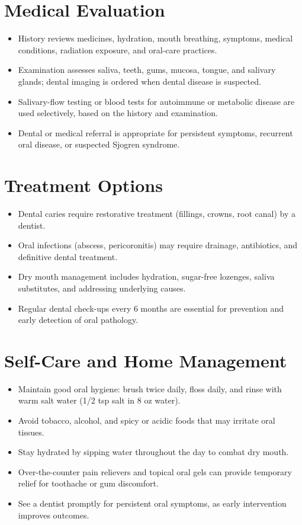 \section*{Medical Evaluation}
\begin{itemize}
  \item History reviews medicines, hydration, mouth breathing, symptoms, medical conditions, radiation exposure, and oral-care practices.
  \item Examination assesses saliva, teeth, gums, mucosa, tongue, and salivary glands; dental imaging is ordered when dental disease is suspected.
  \item Salivary-flow testing or blood tests for autoimmune or metabolic disease are used selectively, based on the history and examination.
  \item Dental or medical referral is appropriate for persistent symptoms, recurrent oral disease, or suspected Sjogren syndrome.
\end{itemize}

\section*{Treatment Options}
\begin{itemize}
  \item Dental caries require restorative treatment (fillings, crowns, root canal) by a dentist.
  \item Oral infections (abscess, pericoronitis) may require drainage, antibiotics, and definitive dental treatment.
  \item Dry mouth management includes hydration, sugar-free lozenges, saliva substitutes, and addressing underlying causes.
  \item Regular dental check-ups every 6 months are essential for prevention and early detection of oral pathology.
\end{itemize}

\section*{Self-Care and Home Management}
\begin{itemize}
  \item Maintain good oral hygiene: brush twice daily, floss daily, and rinse with warm salt water (1/2 tsp salt in 8 oz water).
  \item Avoid tobacco, alcohol, and spicy or acidic foods that may irritate oral tissues.
  \item Stay hydrated by sipping water throughout the day to combat dry mouth.
  \item Over-the-counter pain relievers and topical oral gels can provide temporary relief for toothache or gum discomfort.
  \item See a dentist promptly for persistent oral symptoms, as early intervention improves outcomes.
\end{itemize}

